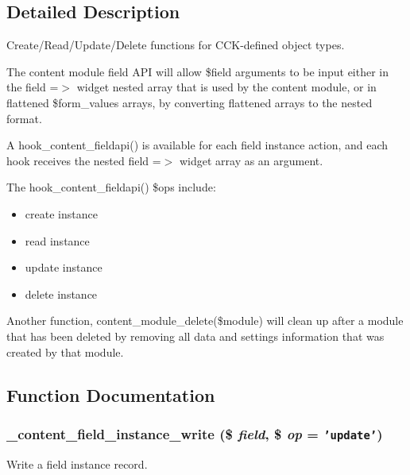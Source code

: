 \subsection{Detailed Description}
Create/Read/Update/Delete functions for CCK-defined object types.

The content module field API will allow \$field arguments to be input either in the field =$>$ widget nested array that is used by the content module, or in flattened \$form\_\-values arrays, by converting flattened arrays to the nested format.

A hook\_\-content\_\-fieldapi() is available for each field instance action, and each hook receives the nested field =$>$ widget array as an argument.

The hook\_\-content\_\-fieldapi() \$ops include:

\begin{itemize}
\item create instance\item read instance\item update instance\item delete instance\end{itemize}


Another function, content\_\-module\_\-delete(\$module) will clean up after a module that has been deleted by removing all data and settings information that was created by that module. 

\subsection{Function Documentation}
\hypertarget{content_8crud_8inc_245bfc4c8eb367690d65bcd02fc11e8e}{
\subsubsection[{\_\-content\_\-field\_\-instance\_\-write}]{\setlength{\rightskip}{0pt plus 5cm}\_\-content\_\-field\_\-instance\_\-write (\$ {\em field}, \/  \$ {\em op} = {\tt 'update'})}}
\label{content_8crud_8inc_245bfc4c8eb367690d65bcd02fc11e8e}


Write a field instance record.

